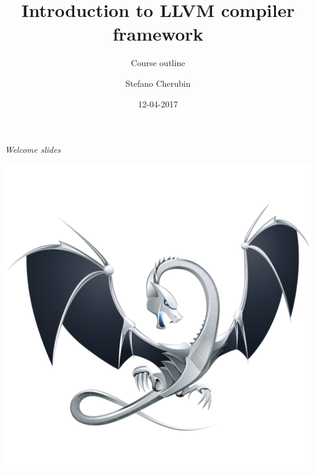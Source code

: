 \documentclass[10pt,mathserif]{beamer}
\author{Stefano Cherubin}
\institute{Politecnico di Milano}
\date{12-04-2017}
\title{Introduction to LLVM compiler framework}
\subtitle{Course outline}
\begin{document}
\begin{frame}
\maketitle
\begin{center}
\itshape\scriptsize Welcome slides
\end{center}
\end{frame}

\begin{frame}[plain]{}
  \begin{center}
    \vspace{-.1\textheight}
    \includegraphics[width=\textwidth]{img/00/logo.png}
  \end{center}
\end{frame}
\end{document}
